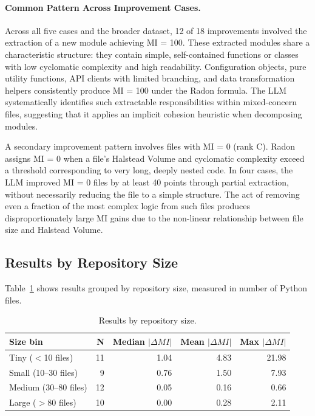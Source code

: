 \documentclass[sigconf,review,anonymous]{acmart}
\begin{document}
\paragraph{Common Pattern Across Improvement Cases.}
Across all five cases and the broader dataset, 12 of 18 improvements involved the extraction of a new module achieving MI = 100. These extracted modules share a characteristic structure: they contain simple, self-contained functions or classes with low cyclomatic complexity and high readability. Configuration objects, pure utility functions, API clients with limited branching, and data transformation helpers consistently produce MI = 100 under the Radon formula. The LLM systematically identifies such extractable responsibilities within mixed-concern files, suggesting that it applies an implicit cohesion heuristic when decomposing modules.

A secondary improvement pattern involves files with MI = 0 (rank C). Radon assigns MI = 0 when a file's Halstead Volume and cyclomatic complexity exceed a threshold corresponding to very long, deeply nested code. In four cases, the LLM improved MI = 0 files by at least 40 points through partial extraction, without necessarily reducing the file to a simple structure. The act of removing even a fraction of the most complex logic from such files produces disproportionately large MI gains due to the non-linear relationship between file size and Halstead Volume.

\subsection{Results by Repository Size}

Table~\ref{tab:exp5_size} shows results grouped by repository size, measured in number of Python files.

\begin{table}[H]
\centering
\small
\caption{Results by repository size.}
\label{tab:exp5_size}
\begin{tabular}{lrrrr}
\toprule
\textbf{Size bin} & \textbf{N} & \textbf{Median $|\Delta MI|$} & \textbf{Mean $|\Delta MI|$} & \textbf{Max $|\Delta MI|$} \\
\midrule
Tiny ($<$10 files)    & 11 & 1.04 & 4.83 & 21.98 \\
Small (10--30 files)  & 9  & 0.76 & 1.50 & 7.93  \\
Medium (30--80 files) & 12 & 0.05 & 0.16 & 0.66  \\
Large ($>$80 files)   & 10 & 0.00 & 0.28 & 2.11  \\
\bottomrule
\end{tabular}
\end{table}
\end{document}
